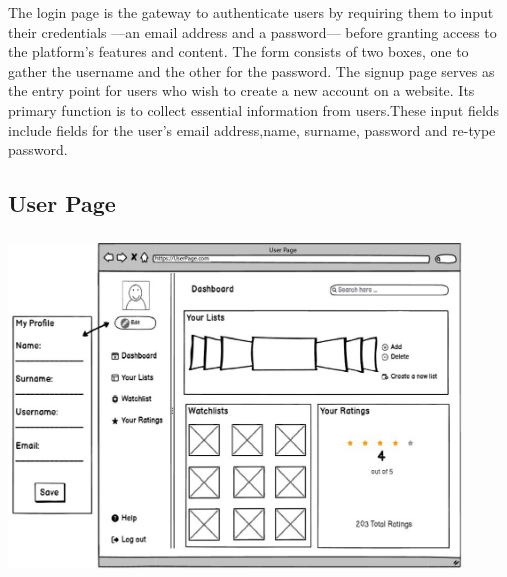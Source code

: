 The login page is the gateway to authenticate users by requiring them to input their credentials —an email address and a password— before granting access to the platform's features and content. The form consists of two boxes, one to gather the username and the other for the password.
The signup page serves as the entry point for users who wish to create a new account on a website. Its primary function is to collect essential information from users.These input fields include fields for the user's email address,name, surname, password and re-type password. 

\subsection{User Page}

\begin{center}
\includegraphics[width=12cm, height=9cm]{pictures/UserPage.jpg}
\end{center}

